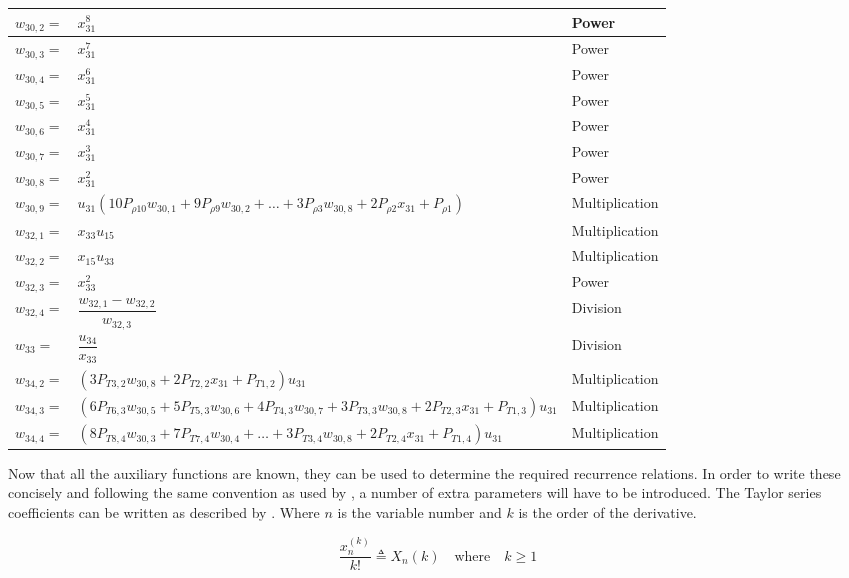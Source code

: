 \begin{longtable}{|p{1.5cm}|l|p{2cm}|}
$w_{30,2}=$ & $ x_{31}^{8} $ & Power \\ \hline
$w_{30,3}=$ & $ x_{31}^{7} $ & Power \\ \hline
$w_{30,4}=$ & $ x_{31}^{6} $ & Power \\ \hline
$w_{30,5}=$ & $ x_{31}^{5} $ & Power \\ \hline
$w_{30,6}=$ & $ x_{31}^{4} $ & Power \\ \hline
$w_{30,7}=$ & $ x_{31}^{3} $ & Power \\ \hline
$w_{30,8}=$ & $ x_{31}^{2} $ & Power \\ \hline
$w_{30,9}=$ & $ u_{31}\left(10 P_{\rho 10}w_{30,1}+9 P_{\rho 9}w_{30,2}+\dots+3 P_{\rho 3}w_{30,8}+2 P_{\rho 2}x_{31}+P_{\rho 1}\right) $ & Multiplication \\ \hline
$w_{32,1}=$ & $ x_{33}u_{15} $ & Multiplication \\ \hline
$w_{32,2}=$ & $ x_{15}u_{33} $ & Multiplication \\ \hline
$w_{32,3}=$ & $ x_{33}^{2} $ & Power \\ \hline
$w_{32,4}=$ & $ \dfrac{w_{32,1}-w_{32,2}}{w_{32,3}} $ & Division \\ \hline
$w_{33}=$ & $ \dfrac{u_{34}}{x_{33}} $ & Division \\ \hline
$w_{34,2}=$ & $ \left(3P_{T 3,2}w_{30,8}+2P_{T 2,2}x_{31}+P_{T 1,2}\right)u_{31} $ & Multiplication \\ \hline
$w_{34,3}=$ & $ \left(6 P_{T 6,3}w_{30,5}+5P_{T 5,3}w_{30,6}+4P_{T 4,3}w_{30,7}+3P_{T 3,3}w_{30,8}+2P_{T 2,3}x_{31}+P_{T 1,3}\right)u_{31} $ & Multiplication \\ \hline
$w_{34,4}=$ & $ \left(8 P_{T 8,4}w_{30,3}+7P_{T 7,4}w_{30,4}+\dots+3P_{T 3,4}w_{30,8}+2P_{T 2,4}x_{31}+P_{T 1,4}\right)u_{31} $ & Multiplication \\ \hline

\end{longtable}

Now that all the auxiliary functions are known, they can be used to determine the required recurrence relations. In order to write these concisely and following the same convention as used by \cite{scott2008high}, a number of extra parameters will have to be introduced. The Taylor series coefficients can be written as described by . Where $n$ is the variable number and $k$ is the order of the derivative.

\begin{equation} \label{eq:tsCoeff}
\dfrac{x_{n}^{\left(k\right)}}{k!} \triangleq X_{n}\left(k\right) \quad \text{where} \quad k \geq 1
\end{equation}

